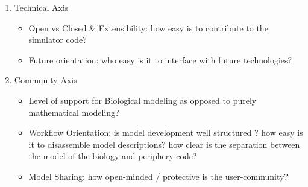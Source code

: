 \documentclass[12pt]{article}
\begin{document}
\begin{enumerate}
\item Technical Axis
  \begin{itemize}
  \item Open vs Closed \& Extensibility: how easy is to contribute to
    the simulator code?
  \item Future orientation: who easy is it to interface with future
    technologies?
  \end{itemize}

\item Community Axis
  \begin{itemize}
  \item Level of support for Biological modeling as opposed to purely
    mathematical modeling?
  \item Workflow Orientation: is model development well structured ?
    how easy is it to disassemble model descriptions?  how clear is
    the separation between the model of the biology and periphery
    code?
  \item Model Sharing: how open-minded / protective is the
    user-community?
  \end{itemize}
\end{enumerate}

\end{document}

